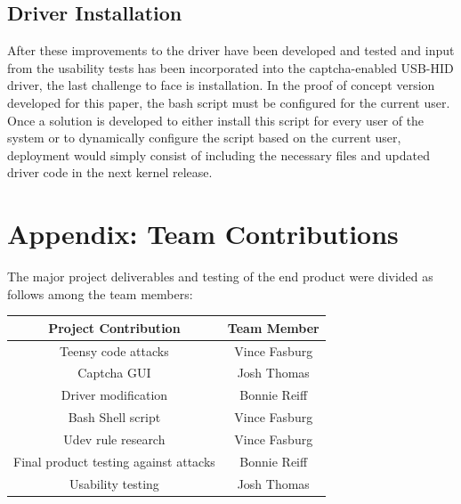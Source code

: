 \documentclass[pagenumbers]{ieee}
\begin{document}
\subsection{Driver Installation}
\label{section:installation}

After these improvements to the driver have been developed and tested and input from the usability tests has been incorporated into the captcha-enabled USB-HID driver, the last challenge to face is installation. In the proof of concept version developed for this paper, the bash script must be configured for the current user. Once a solution is developed to either install this script for every user of the system or to dynamically configure the script based on the current user, deployment would simply consist of including the necessary files and updated driver code in the next kernel release.



\appendix 

\newpage%

\section{Appendix: Team Contributions}

The major project deliverables and testing of the end product were divided as follows among the team members:

\begin{center}
	\begin{tabular}{ | c | c | }
		\hline \textbf{Project Contribution} & \textbf{Team Member} \\ \hline
		Teensy code attacks & Vince Fasburg \\ \hline
		Captcha GUI & Josh Thomas \\ \hline
		Driver modification & Bonnie Reiff \\ \hline
		Bash Shell script & Vince Fasburg \\ \hline
		Udev rule research & Vince Fasburg \\ \hline
		Final product testing against attacks & Bonnie Reiff \\ \hline
		Usability testing & Josh Thomas \\ \hline
	\end{tabular}
\end{center}
\end{document}
